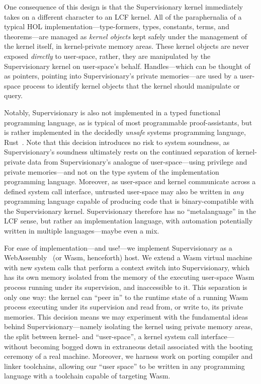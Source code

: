 \documentclass[a4paper, UKenglish, cleveref, autoref, thm-restate, colorlinks]{lipics-v2021}
\begin{document}
One consequence of this design is that the Supervisionary kernel immediately takes on a different character to an LCF kernel.
All of the paraphernalia of a typical HOL implementation---type-formers, types, constants, terms, and theorems---are managed as \emph{kernel objects} kept safely under the management of the kernel itself, in kernel-private memory areas.
These kernel objects are never exposed \emph{directly} to user-space, rather, they are manipulated by the Supervisionary kernel on user-space's behalf.
Handles---which can be thought of as pointers, pointing into Supervisionary's private memories---are used by a user-space process to identify kernel objects that the kernel should manipulate or query.

Notably, Supervisionary is also not implemented in a typed functional programming language, as is typical of most programmable proof-assistants, but is rather implemented in the decidedly \emph{unsafe} systems programming language, Rust~\cite{DBLP:phd/dnb/Jung20}.
Note that this decision introduces no risk to system soundness, as Supervisionary's soundness ultimately rests on the continued separation of kernel-private data from Supervisionary's analogue of user-space---using privilege and private memories---and not on the type system of the implementation programming language.
Moreover, as user-space and kernel communicate across a defined system call interface, untrusted user-space may also be written in \emph{any} programming language capable of producing code that is binary-compatible with the Supervisionary kernel.
Supervisionary therefore has no ``metalanguage'' in the LCF sense, but rather an implementation language, with automation potentially written in multiple languages---maybe even a mix.

For ease of implementation---and use!---we implement Supervisionary as a WebAssembly~\cite{DBLP:conf/pldi/HaasRSTHGWZB17} (or Wasm, henceforth) host.
We extend a Wasm virtual machine with new system calls that perform a context switch into Supervisionary, which has its own memory isolated from the memory of the executing user-space Wasm process running under its supervision, and inaccessible to it.
This separation is only one way: the kernel can ``peer in'' to the runtime state of a running Wasm process executing under its supervision and read from, or write to, its private memories.
This decision means we may experiment with the fundamental ideas behind Supervisionary---namely isolating the kernel using private memory areas, the split between kernel- and ``user-space'', a kernel system call interface---without becoming bogged down in extraneous detail associated with the booting ceremony of a real machine.
Moreover, we harness work on porting compiler and linker toolchains, allowing our ``user space'' to be written in any programming language with a toolchain capable of targeting Wasm.
\end{document}
